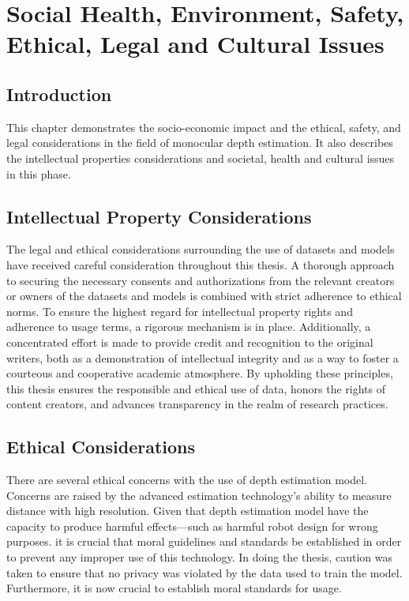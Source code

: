 \documentclass[a4paper,12pt,oneside]{book}
\begin{document}
\chapter{\textbf{Social Health, Environment, Safety, Ethical, Legal and Cultural Issues}}\label{chap:social}
\section{Introduction}
This chapter demonstrates the socio-economic impact and the ethical, safety, and legal considerations in the field of monocular depth estimation. It also describes the intellectual properties considerations and societal, health and cultural issues in this phase.
\section{Intellectual Property Considerations}
The legal and ethical considerations surrounding the use of datasets and models have received careful consideration throughout this thesis. A thorough approach to securing the necessary consents and authorizations from the relevant creators or owners of the datasets and models is combined with strict adherence to ethical norms. To ensure the highest regard for intellectual property rights and adherence to usage terms, a rigorous mechanism is in place. Additionally, a concentrated effort is made to provide credit and recognition to the original writers, both as a demonstration of intellectual integrity and as a way to foster a courteous and cooperative academic atmosphere. By upholding these principles, this thesis ensures the responsible and ethical use of data, honors the rights of content creators, and advances transparency in the realm of research practices.
\section{Ethical Considerations}
There are several ethical concerns with the use of depth estimation model. Concerns are raised by the advanced estimation technology's ability to measure distance with high resolution. Given that depth estimation model have the capacity to produce harmful effects—such as harmful robot design for wrong purposes. it is crucial that moral guidelines and standards be established in order to prevent any improper use of this technology. In doing the thesis, caution was taken to ensure that no privacy was violated by the data used to train the model. Furthermore, it is now crucial to establish moral standards for usage.
\end{document}
